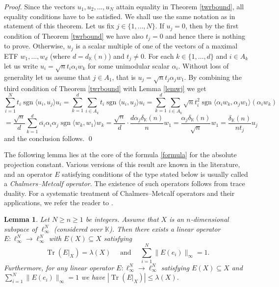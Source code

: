\documentclass[12pt, reqno]{amsart}
\newtheorem{lem}[twr]{Lemma}
\theoremstyle{definition}
\theoremstyle{remark}
\numberwithin{equation}{section}
\DeclareMathOperator{\tr}{Tr}
\DeclareMathOperator{\sgn}{sgn}
\begin{document}
\emph{Proof.} Since the vectors $u_1, u_2, \ldots, u_N$ attain equality in Theorem \ref{twrbound}, all equality conditions have to be satisfied. We shall use the same notation as in statement of this theorem. Let us fix $j \in \{1, \ldots, N\}$. If $u_j=0$, then by the first condition of Theorem \ref{twrbound} we have also $t_j=0$ and hence there is nothing to prove. Otherwise, $u_j$ is a scalar multiple of one of the vectors of a maximal ETF $w_1, \ldots, w_{d}$ (where $d=d_{\mathbb{K}}(n)$) and $t_j \neq 0$. For each $k \in \{1, \ldots, d\}$ and $i \in A_k$ let us write $u_i = \sqrt{n}t_i \alpha_i w_k$ for some unimodular scalar $\alpha_i$. Without loss of generality let us assume that $j \in A_1$, that is $u_j=\sqrt{n} t_j \alpha_j w_1$. By combining the third condition of Theorem \ref{twrbound} with Lemma \ref{lemwj} we get
$$\sum_{i=1}^N t_i \sgn \langle u_i, u_j \rangle u_i =  \sum_{k=1}^{d} \sum_{i \in A_k} t_i \sgn \langle u_i, u_j \rangle u_i = \sum_{k=1}^{d} \sum_{i \in A_k} \sqrt{n} t^2_i \sgn \langle \alpha_i w_k, \alpha_j w_1 \rangle (\alpha_iw_k)$$
$$=\frac{\sqrt{n}}{d} \sum_{k=1}^{d} \overline{\alpha_i} \alpha_i \alpha_j \sgn \langle w_k, w_1 \rangle w_k = \frac{\sqrt{n}}{d} \cdot \frac{d \alpha_j \delta_{\mathbb{K}}(n)}{n}  w_1 = \frac{\alpha_j\delta_{\mathbb{K}}(n)}{\sqrt{n}} w_1 = \frac{\delta_{\mathbb{K}}(n)}{nt_j} u_j$$
and the conclusion follows. \qed


The following lemma lies at the core of the formula \eqref{formula} for the absolute projection constant. Various versions of this result are known in the literature, and an operator $E$ satisfying conditions of the type stated below is usually called a \emph{Chalmers--Metcalf operator}. The existence of such operators follows from trace duality. For a systematic treatment of Chalmers--Metcalf operators and their applications, we refer the reader to \cite{lewickiskrzypek}.

\begin{lem}
\label{lemcm}
Let $N \geq n \geq 1$ be integers. Assume that $X$ is an $n$-dimensional subspace of $\ell_{\infty}^N$ (considered over $\mathbb{K}$). Then there exists a linear operator $E: \ell_{\infty}^{N} \to \ell_{\infty}^N$ with $E(X) \subseteq X$ satisfying 
$$\tr (E|_X) = \lambda(X) \quad \text{ and } \quad \sum_{i=1}^{N} \|E(e_i)\|_{\infty}=1.$$
Furthermore, for any linear operator $E: \ell_{\infty}^{N} \to \ell_{\infty}^N$ satisfying $E(X) \subseteq X$ and $\sum_{i=1}^{N} \|E(e_i)\|_{\infty}=1$ we have $\left |\tr (E|_X) \right | \leq \lambda(X)$.
\end{lem}
\end{document}
